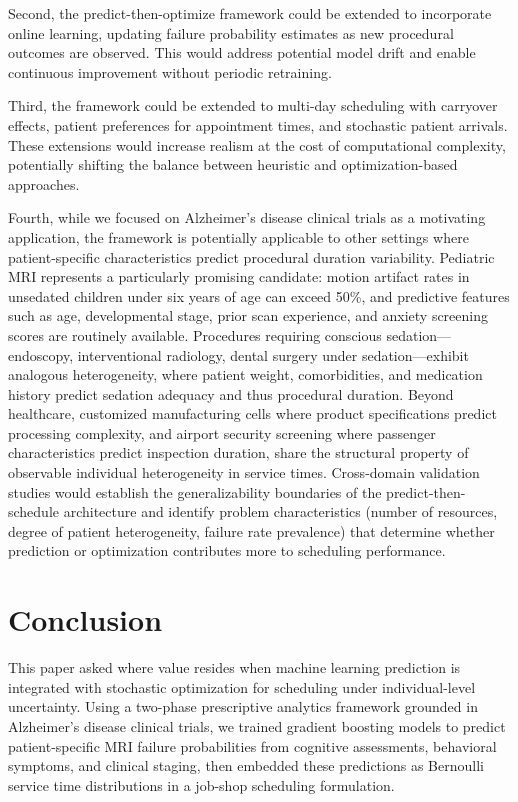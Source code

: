 \documentclass[11pt,a4paper]{article}
\begin{document}
Second, the predict-then-optimize framework could be extended to incorporate online learning, updating failure probability estimates as new procedural outcomes are observed. This would address potential model drift and enable continuous improvement without periodic retraining.

Third, the framework could be extended to multi-day scheduling with carryover effects, patient preferences for appointment times, and stochastic patient arrivals. These extensions would increase realism at the cost of computational complexity, potentially shifting the balance between heuristic and optimization-based approaches.

Fourth, while we focused on Alzheimer's disease clinical trials as a motivating application, the framework is potentially applicable to other settings where patient-specific characteristics predict procedural duration variability. Pediatric MRI represents a particularly promising candidate: motion artifact rates in unsedated children under six years of age can exceed 50\%, and predictive features such as age, developmental stage, prior scan experience, and anxiety screening scores are routinely available. Procedures requiring conscious sedation---endoscopy, interventional radiology, dental surgery under sedation---exhibit analogous heterogeneity, where patient weight, comorbidities, and medication history predict sedation adequacy and thus procedural duration. Beyond healthcare, customized manufacturing cells where product specifications predict processing complexity, and airport security screening where passenger characteristics predict inspection duration, share the structural property of observable individual heterogeneity in service times. Cross-domain validation studies would establish the generalizability boundaries of the predict-then-schedule architecture and identify problem characteristics (number of resources, degree of patient heterogeneity, failure rate prevalence) that determine whether prediction or optimization contributes more to scheduling performance.



\section{Conclusion}
\label{sec:conclusion}

This paper asked where value resides when machine learning prediction is integrated with stochastic optimization for scheduling under individual-level uncertainty. Using a two-phase prescriptive analytics framework grounded in Alzheimer's disease clinical trials, we trained gradient boosting models to predict patient-specific MRI failure probabilities from cognitive assessments, behavioral symptoms, and clinical staging, then embedded these predictions as Bernoulli service time distributions in a job-shop scheduling formulation.
\end{document}
